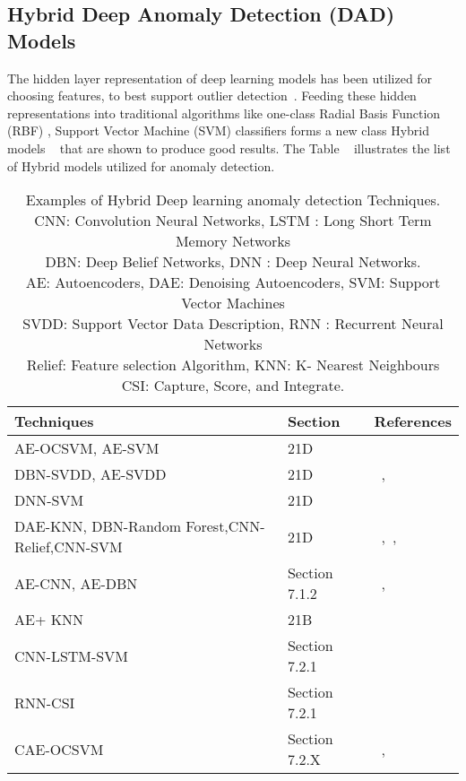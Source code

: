 \subsection{Hybrid Deep Anomaly Detection (DAD) Models}
\label{sec:hybridModels}
The hidden layer representation of deep learning models  has been utilized  for choosing features, to best support outlier detection~\cite{andrews2016detecting}. Feeding these hidden representations into traditional algorithms like one-class Radial Basis Function (RBF) , Support Vector Machine (SVM) classifiers forms a new class Hybrid models ~\cite{erfani2016high,erfani2016robust,wu2015harvesting} that are shown to produce good results. The Table ~\cite{tab:hybridModels} illustrates the list of Hybrid models utilized for anomaly detection.

\begin{table*}
\begin{center}
\caption{Examples of  Hybrid Deep learning anomaly detection Techniques.
        \\CNN: Convolution Neural Networks, LSTM : Long Short Term Memory Networks
        \\DBN: Deep Belief Networks, DNN : Deep Neural Networks.
        \\AE: Autoencoders, DAE: Denoising Autoencoders, SVM: Support Vector Machines
        \\SVDD: Support Vector Data Description, RNN : Recurrent Neural Networks
        \\Relief: Feature selection Algorithm, KNN: K- Nearest Neighbours
        \\CSI: Capture, Score, and Integrate. }
    \label{tab:hybridModels}
    \begin{tabular}{ | p{3cm} | p{2cm} | p{6cm} |}
    \hline
     \textbf{Techniques}  & \textbf{Section} & \textbf{References} \\ \hline
     AE-OCSVM, AE-SVM & 21D & ~\cite{andrews2016detecting} \\\hline
     DBN-SVDD, AE-SVDD & 21D & ~\cite{erfani2016high},~\cite{kim2015deep} \\\hline
     DNN-SVM & 21D & ~\cite{inoue2017anomaly} \\\hline
     DAE-KNN, DBN-Random Forest,CNN-Relief,CNN-SVM & 21D & ~\cite{song2017hybrid},~\cite{shi2017semi},~\cite{zhu2018hybrid,urbanowicz2018relief} \\\hline
     AE-CNN, AE-DBN & Section 7.1.2 &  ~\cite{wang2018effective},~\cite{li2015hybrid} \\\hline
     AE+ KNN & 21B & ~\cite{song2017hybrid} \\\hline
     CNN-LSTM-SVM & Section 7.2.1  & ~\cite{wei2017new}\\
     RNN-CSI & Section 7.2.1  & ~\cite{ruchansky2017csi}\\
     CAE-OCSVM &  Section 7.2.X  & ~\cite{gutoskidetection}, ~\cite{dotti2017unsupervised}\\\hline
    \end{tabular}
\end{center}
\end{table*}

